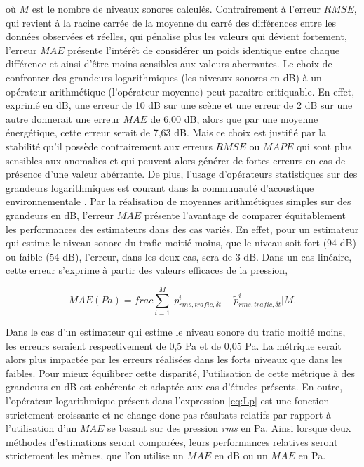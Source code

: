 où $M$ est le nombre de niveaux sonores calculés.
Contrairement à l'erreur $RMSE$, qui revient à la racine carrée de la moyenne du carré des différences entre les données observées et réelles, qui pénalise plus les valeurs qui dévient fortement, l'erreur $MAE$ présente l'intérêt de considérer un poids identique entre chaque différence et ainsi d'être moins sensibles aux valeurs aberrantes. 
Le choix de confronter des grandeurs logarithmiques (les niveaux sonores en dB) à un opérateur arithmétique (l'opérateur moyenne) peut paraitre critiquable. En effet, exprimé en dB, une erreur de 10 dB sur une scène et une erreur de 2 dB sur une autre donnerait une erreur $MAE$ de 6,00 dB, alors que par une moyenne énergétique, cette erreur serait de 7,63 dB. Mais ce choix est justifié par la stabilité qu'il possède contrairement aux erreurs $RMSE$ ou $MAPE$ qui sont plus sensibles aux anomalies et qui peuvent alors générer de fortes erreurs en cas de présence d'une valeur abérrante. De plus, l'usage d'opérateurs statistiques sur des grandeurs logarithmiques est courant dans la communauté d'acoustique environnementale \cite{aumond2018kriging,morillas2014uncertainty}.
Par la réalisation de moyennes arithmétiques simples sur des grandeurs en dB, l'erreur $MAE$ présente l'avantage de comparer équitablement les performances des estimateurs dans des cas variés. En effet, pour un estimateur qui estime le niveau sonore du trafic moitié moins, que le niveau soit fort (94 dB) ou faible (54 dB), l'erreur, dans les deux cas, sera de 3 dB. Dans un cas linéaire, cette erreur s'exprime à partir des valeurs efficaces de la pression, 

\begin{equation}
MAE (Pa) = frac{\sum_{i = 1}^{M} \vert p_{rms, trafic, \delta t}^i - \tilde{p}_{rms, trafic, \delta t}^i \vert}{M}.
\end{equation}

Dans le cas d'un estimateur qui estime le niveau sonore du trafic moitié moins, les erreurs seraient respectivement de 0,5 Pa et de 0,05 Pa. La métrique serait alors plus impactée par les erreurs réalisées dans les forts niveaux que dans les faibles. Pour mieux équilibrer cette disparité, l'utilisation de cette métrique à des grandeurs en dB est cohérente et adaptée aux cas d'études présents. 
En outre, l'opérateur logarithmique présent dans l'expression \ref{eq:Lp} est une fonction strictement croissante et ne change donc pas résultats relatifs par rapport à l'utilisation d'un $MAE$ se basant sur des pression \textit{rms} en Pa. Ainsi lorsque deux méthodes d'estimations seront comparées, leurs performances relatives seront strictement les mêmes, que l'on utilise un $MAE$ en dB ou un $MAE$ en Pa.

